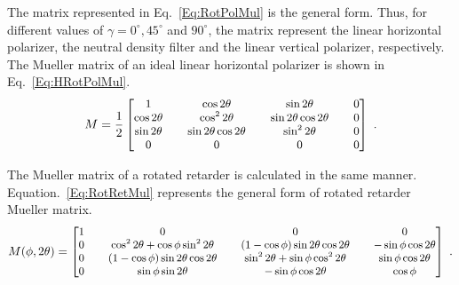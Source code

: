 \noindent The matrix represented in Eq.~\ref{Eq:RotPolMul} is the general form.
Thus, for different values of $\gamma = 0^{\circ} , 45^{\circ}$ and $90^{\circ}$, the matrix represent the linear horizontal polarizer, the neutral density filter and the linear vertical polarizer, respectively.
The Mueller matrix of an ideal linear horizontal polarizer is shown in Eq.~\ref{Eq:HRotPolMul}. 
\begin{equation}\label{Eq:HRotPolMul}
\small
	M = \frac{1}{2} 
	\begin{bmatrix}
	 1  & & \cos 2\theta  & & \sin 2\theta  & & 0\\ 
	 \cos 2\theta   & & \cos^{2} 2\theta  & & \sin 2\theta \cos 2\theta  & & 0\\
	  \sin 2\theta   & & \sin 2\theta \cos 2\theta  & & \sin^{2} 2\theta   & & 0\\
	 0  & &0  & &0  & &0\\
	\end{bmatrix}~.
\end{equation}
%

\noindent The Mueller matrix of a rotated retarder is calculated in the same manner.
Equation.~\ref{Eq:RotRetMul} represents the general form of rotated retarder Mueller matrix. 
\begin{equation}\label{Eq:RotRetMul}
\small
	M(\phi , 2\theta)= 
	\begin{bmatrix}
	 1  & & 0  & & 0  & & 0\\ 
	 0  & &\cos^{2} 2\theta + \cos \phi \sin^{2} 2\theta  & & (1-\cos \phi)\sin 2\theta \cos 2\theta  & &   -\sin \phi \cos 2\theta\\
	 0  & & (1-\cos\phi)\sin 2\theta \cos 2\theta  & & \sin^{2} 2\theta + \sin \phi \cos^{2} 2\theta  & & \sin \phi \cos 2\theta\\
	 0  & & \sin \phi \sin 2\theta  & & -\sin \phi \cos 2\theta  & &\cos \phi\\
	\end{bmatrix}~.
\end{equation}

